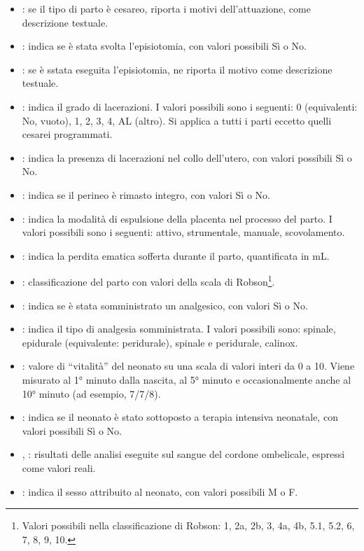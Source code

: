 \begin{itemize}
\item {}: se il tipo di parto è cesareo, riporta i motivi dell'attuazione, come descrizione testuale.
\item {}: indica se è stata svolta l'episiotomia, con valori possibili Sì o No.
\item {}: se è sstata eseguita l'episiotomia, ne riporta il motivo come descrizione testuale.
\item {}: indica il grado di lacerazioni. I valori possibili sono i seguenti: 0 (equivalenti: No, vuoto), 1, 2, 3, 4, AL (altro). Si applica a tutti i parti eccetto quelli cesarei programmati.
\item {}: indica la presenza di lacerazioni nel collo dell'utero, con valori possibili Sì o No.
\item {}: indica se il perineo è rimasto integro, con valori Sì o No.
\item {}: indica la modalità di espulsione della placenta nel processo del parto. I valori possibili sono i seguenti: attivo, strumentale, manuale, scovolamento.
\item {}: indica la perdita ematica sofferta durante il parto, quantificata in mL.
\item {}: classificazione del parto con valori della scala di Robson\footnote{
    Valori possibili nella classificazione di Robson: 1, 2a, 2b, 3, 4a, 4b, 5.1, 5.2, 6, 7, 8, 9, 10.
}.
\item {}: indica se è stata somministrato un analgesico, con valori Sì o No.
\item {}: indica il tipo di analgesia somministrata. I valori possibili sono: spinale, epidurale (equivalente: peridurale), spinale e peridurale, calinox.
\item {}: valore di \enquote{vitalità} del neonato su una scala di valori interi da 0 a 10. Viene misurato al 1° minuto dalla nascita, al 5° minuto e occasionalmente anche al 10° minuto (ad esempio, 7/7/8).
\item {}: indica se il neonato è stato sottoposto a terapia intensiva neonatale, con valori possibili Sì o No.
\item {}, : risultati delle analisi eseguite sul sangue del cordone ombelicale, espressi come valori reali.
\item {}: indica il sesso attribuito al neonato, con valori possibili M o F.
\end{itemize}

